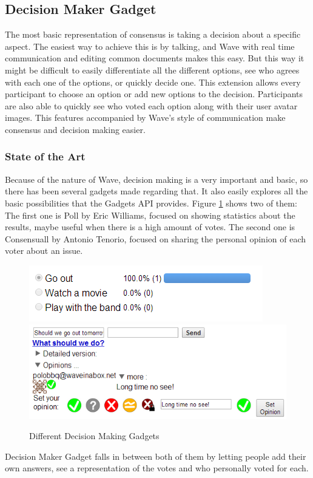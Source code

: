 \subsection{Decision Maker Gadget}
The most basic representation of consensus is taking a decision about a specific aspect. The easiest way to achieve this is by talking, and Wave with real time communication and editing common documents makes this easy. But this way it might be difficult to easily differentiate all the different options, see who agrees with each one of the options, or quickly decide one. This extension allows every participant to choose an option or add new options to the decision. Participants are also able to quickly see who voted each option along with their user avatar images. This features accompanied by Wave's style of communication make consensus and decision making easier.

\subsubsection{State of the Art}
Because of the nature of Wave, decision making is a very important and basic, so there has been several gadgets made regarding that. It also easily explores all the basic possibilities that the Gadgets API provides. Figure \ref{fig:decision_gadgets} shows two of them: The first one is Poll by Eric Williams, focused on showing statistics about the results, maybe useful when there is a high amount of votes. The second one is Consensuall by Antonio Tenorio, focused on sharing the personal opinion of each voter about an issue.\\[.2cm]
\begin{figure}[h]
  \center
    \includegraphics[keepaspectratio, scale=0.7]{Media/Captures/Extensions/DecisionGadgets/other.png}
    \includegraphics[keepaspectratio, scale=0.7]{Media/Captures/Extensions/DecisionGadgets/consensuall.png}
  \caption{Different Decision Making Gadgets}
  \label{fig:decision_gadgets}
\end{figure}
Decision Maker Gadget falls in between both of them by letting people add their own answers, see a representation of the votes and who personally voted for each.

